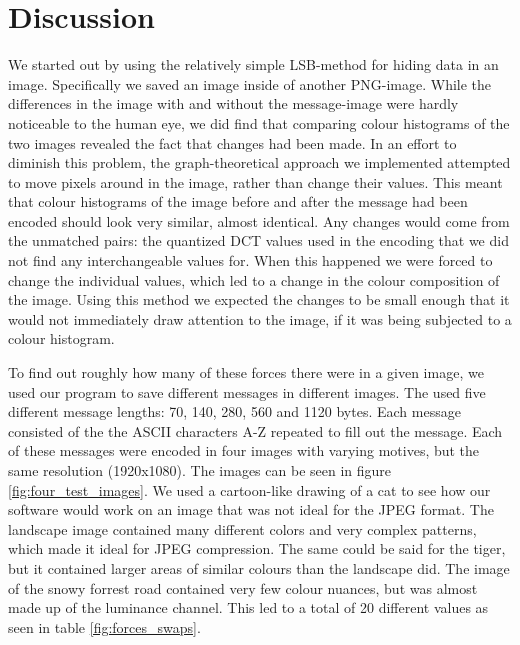 \section{Discussion}
We started out by using the relatively simple LSB-method for hiding data in an image.
Specifically we saved an image inside of another PNG-image.
While the differences in the image with and without the message-image were hardly noticeable to the human eye, we did find that comparing colour histograms of the two images revealed the fact that changes had been made.
In an effort to diminish this problem, the graph-theoretical approach we implemented attempted to move pixels around in the image, rather than change their values.
This meant that colour histograms of the image before and after the message had been encoded should look very similar, almost identical.
Any changes would come from the unmatched pairs: the quantized DCT values used in the encoding that we did not find any interchangeable values for.
When this happened we were forced to change the individual values, which led to a change in the colour composition of the image.
Using this method we expected the changes to be small enough that it would not immediately draw attention to the image, if it was being subjected to a colour histogram.

To find out roughly how many of these forces there were in a given image, we used our program to save different messages in different images.
The used five different message lengths: 70, 140, 280, 560 and 1120 bytes.
Each message consisted of the the ASCII characters A-Z repeated to fill out the message.
Each of these messages were encoded in four images with varying motives, but the same resolution (1920x1080).
The images can be seen in figure \ref{fig:four_test_images}.
We used a cartoon-like drawing of a cat to see how our software would work on an image that was not ideal for the JPEG format.
The landscape image contained many different colors and very complex patterns, which made it ideal for JPEG compression.
The same could be said for the tiger, but it contained larger areas of similar colours than the landscape did.
The image of the snowy forrest road contained very few colour nuances, but was almost made up of the luminance channel.
This led to a total of 20 different values as seen in table \ref{fig:forces_swaps}.




